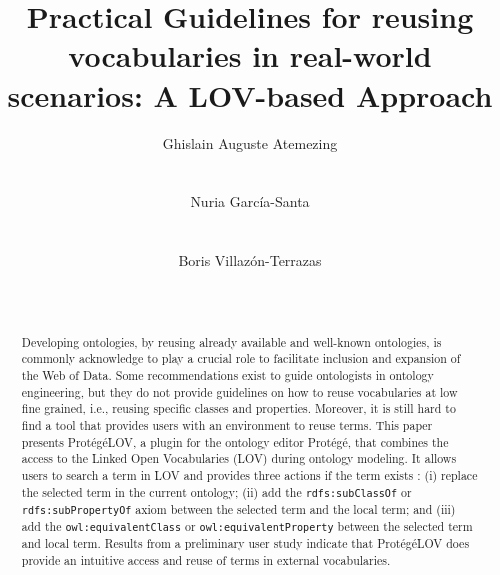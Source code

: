 \documentclass{sig-alternate}
\begin{document}


\title{Practical Guidelines for reusing vocabularies in real-world scenarios: A LOV-based Approach}

\author{
\alignauthor Ghislain Auguste Atemezing\\
       \\
       \\
  \alignauthor Nuria Garc{\'i}a-Santa\\
       \\
       \\
\alignauthor Boris Villaz{\'o}n-Terrazas\\
       \\
       \\
}

\maketitle



\begin{abstract}
Developing ontologies, by reusing already available and well-known ontologies, is commonly acknowledge to play a crucial role to facilitate inclusion and expansion of the Web of Data. Some recommendations exist to guide ontologists in ontology engineering, but they do not provide guidelines on how to reuse vocabularies at low fine grained, i.e., reusing specific classes and properties. Moreover, it is still hard to find a tool that provides users with an environment to reuse terms. This paper presents Prot{\'e}g{\'e}LOV, a plugin for the ontology editor Prot{\'e}g{\'e}, that combines the access to the Linked Open Vocabularies (LOV) during ontology modeling. It allows users to search a term in LOV and provides three actions if the term exists : (i) replace the selected term in the current ontology; (ii) add the {\tt rdfs:subClassOf} or {\tt rdfs:subPropertyOf} axiom between the selected term and the local term; and (iii) add the {\tt owl:equivalentClass} or {\tt owl:equivalentProperty} between the selected term and local term. Results from a preliminary user study indicate that Prot{\'e}g{\'e}LOV does provide an intuitive access and reuse of terms in external vocabularies.
\end{abstract}
\end{document}
